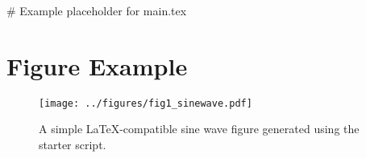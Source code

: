 # Example placeholder for main.tex


\section*{Figure Example}

\begin{figure}[h!]
\centering
\texttt{[image: ../figures/fig1\_sinewave.pdf]}
\caption{A simple LaTeX-compatible sine wave figure generated using the starter script.}
\end{figure}
